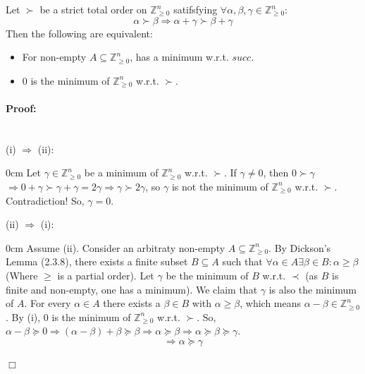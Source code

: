 \begin{corollary}[title = Corollary 2.3.9]
  Let $\succ$ be a strict total order on $\mathbb{Z}^n_{\geq 0}$ satifsfying $\forall \alpha, \beta, \gamma \in \mathbb{Z}^n_{\geq 0}$:
  \[\alpha \succ \beta \Rightarrow \alpha + \gamma \succ \beta + \gamma\]  Then the following are equivalent: 

  \begin{itemize}
    \item[(i)] For non-empty $A \subseteq \mathbb{Z}^n_{\geq 0}$, has a minimum w.r.t. $succ$.
    \item[(ii)] 0 is the minimum of $\mathbb{Z}^n_{\geq 0}$ w.r.t. $\succ$.
  \end{itemize} 

  \paragraph{Proof:}  \ \\ 
  (i) $\Rightarrow$ (ii):
  \begin{addmargin}[0.5cm]{0cm}
    Let $\gamma \in \mathbb{Z}^n_{\geq 0}$ be a minimum of $\mathbb{Z}^n_{\geq 0}$ w.r.t. $\succ$. If $\gamma \neq 0$, then $0 \succ \gamma$ 
    $\Rightarrow   0 + \gamma \succ \gamma + \gamma = 2 \gamma \Rightarrow \gamma \succ 2\gamma$, so $\gamma$ is not the minimum of $\mathbb{Z}^n_{\geq 0}$ w.r.t. $\succ$. Contradiction! So, $\gamma = 0$. 
  \end{addmargin}
    
  (ii) $\Rightarrow$ (i):
    \begin{addmargin}[0.5cm]{0cm}
      Assume (ii). Consider an arbitraty non-empty $A \subseteq \mathbb{Z}^n_{\geq 0}$. By Dickson's Lemma (2.3.8), there exists a finite subset $B \subseteq A$ 
      such that $\forall \alpha \in A \exists \beta \in B: \alpha \geq \beta$ (Where $\geq$ is a partial order). Let $\gamma$ be the minimum of $B$ w.r.t. $\prec$ (as $B$ is finite and non-empty, one has a minimum).  
      We claim that $\gamma$ is also the minimum of $A$. For every $\alpha \in A$ there exists a $\beta \in B$ with $\alpha \geq \beta$, which means $\alpha - \beta \in \mathbb{Z}^n_{\geq 0}$. By (i), 0 is the minimum of $\mathbb{Z}^n_{\geq 0}$ w.r.t. $\succ$. 
      So, $\alpha - \beta \succcurlyeq 0 \Rightarrow (\alpha - \beta ) + \beta \succcurlyeq \beta \Rightarrow \alpha \succcurlyeq \beta  \Rightarrow \alpha \succcurlyeq \beta \succcurlyeq \gamma$. 
      \[\Rightarrow \alpha \succcurlyeq \gamma\]
    \end{addmargin}

    \begin{flushright}
      $\Box $
    \end{flushright}
\end{corollary}